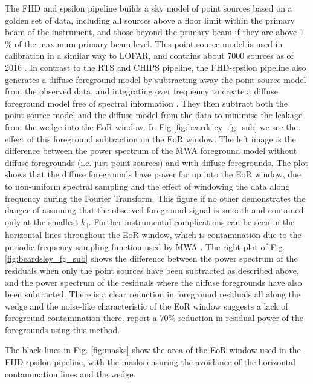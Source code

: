 The FHD \cite{Sullivan2012ApJ...759...17S} and $\epsilon$psilon \cite{Barry2019arXiv190102980B} pipeline builds a sky model of point sources based on a golden set of data, including all sources above a floor limit within the primary beam of the instrument, and those beyond the primary beam if they are above 1$\%$ of the maximum primary beam level. This point source model is used in calibration in a similar way to LOFAR, and contains about 7000 sources as of 2016 \cite{Beardsley2016ApJ...833..102B}. In contrast to the RTS \cite{Mitchell2008ISTSP...2..707M} and CHIPS \cite{Trott2016ApJ...818..139T} pipeline, the FHD-$\epsilon$psilon pipeline also generates a diffuse foreground model by subtracting away the point source model from the observed data, and integrating over frequency to create a diffuse foreground model free of spectral information \cite{Beardsley2016ApJ...833..102B}. They then subtract both the point source model and the diffuse model from the data to minimise the leakage from the wedge into the EoR window. In Fig \ref{fig:beardsley_fg_sub} we see the effect of this foreground subtraction on the EoR window. The left image is the difference between the power spectrum of the MWA foreground model without diffuse foregrounds (i.e. just point sources) and with diffuse foregrounds. The plot shows that the diffuse foregrounds have power far up into the EoR window, due to non-uniform spectral sampling and the effect of windowing the data along frequency during the Fourier Transform. This figure if no other demonstrates the danger of assuming that the observed foreground signal is smooth and contained only at the smallest $k_\parallel$. Further instrumental complications can be seen in the horizontal lines throughout the EoR window, which is contamination due to the periodic frequency sampling function used by MWA \cite{Offringa2016MNRAS.458.1057O}. The right plot of Fig. \ref{fig:beardsley_fg_sub} shows the difference between the power spectrum of the residuals when only the point sources have been subtracted as described above, and the power spectrum of the residuals where the diffuse foregrounds have also been subtracted. There is a clear reduction in foreground residuals all along the wedge and the noise-like characteristic of the EoR window suggests a lack of foreground contamination there. \cite{Beardsley2016ApJ...833..102B} report a 70$\%$ reduction in residual power of the foregrounds using this method.

The black lines in Fig. \ref{fig:masks} show the area of the EoR window used in the FHD-$\epsilon$psilon pipeline, with the masks ensuring the avoidance of the horizontal contamination lines and the wedge.

